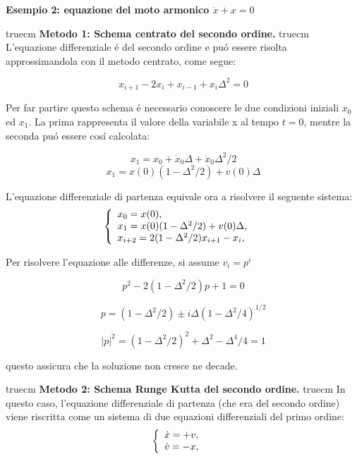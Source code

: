 \documentclass[11pt,a4paper,twoside]{book}
\begin{document}
\pagestyle{empty}
\parindent 0pt

{\bf  \begin{center}
  {\large \bf Esempio 2: equazione del moto armonico $ \ddot{x}+x=0 $  }        \end{center} }

 truecm \textbf{Metodo 1: Schema centrato del secondo
ordine.} truecm L'equazione differenziale \'e del secondo
ordine e pu\'o essere risolta approssimandola con il metodo
centrato, come segue:

$$ x_{i+1}-2x_i+x_{i-1} +x_i\Delta^2=0 $$

Per far partire questo schema \'e necessario conoscere le due
condizioni iniziali $x_0$ ed $x_1$. La prima rappresenta il valore
della variabile x al tempo $t=0$, mentre la seconda pu\'o essere
cos\'i calcolata:

$$ x_1=x_0+ \dot{x}_0 \Delta + \ddot{x}_0 \Delta^2/2 $$
$$ x_1= x(0)(1-\Delta^2/2)+v(0)\Delta $$

L'equazione differenziale di partenza equivale ora a risolvere il
seguente sistema:
\begin{displaymath}
\left\{
  \begin{array}{ll}
    x_0=x(0), & \hbox{} \\
    x_1= x(0)(1-\Delta^2/2)+v(0)\Delta, & \hbox{} \\
    x_{i+2}= 2(1-\Delta^2/2)x_{i+1}-x_i, & \hbox{}
  \end{array}
\right. \end{displaymath}

Per risolvere l'equazione alle differenze, si assume $ v_i=p^i $

$$ p^2-2(1-\Delta^2/2)p+1=0 $$

$$ p= (1-\Delta^2/2)\pm i\Delta (1-\Delta^2/4)^{1/2} $$

$$ |p|^2 = (1-\Delta^2/2)^2 + \Delta^2-\Delta^4/4 = 1 $$

 questo assicura che la soluzione non cresce ne decade.


 truecm \textbf{Metodo 2: Schema Runge Kutta  del secondo
ordine. }  truecm In questo caso, l'equazione
differenziale di partenza (che era del secondo ordine) viene
riscritta come un sistema di due equazioni differenziali del primo
ordine:
\begin{displaymath}
\left\{
  \begin{array}{ll}
    \dot{x}=+v, & \hbox{} \\
    \dot{v}=-x, & \hbox{}
  \end{array}
\right. \end{displaymath}
\end{document}

